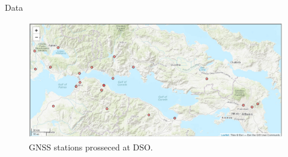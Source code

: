 \documentclass[final,a0,portrait]{beamer}
\newlength{\onecolwid}
\begin{document}
\begin{frame}[t]
\begin{columns}[t]
\begin{column}{\onecolwid}
\begin{block}{Data}
{%
}
\begin{figure}
  \centering
  \includegraphics[width=1\onecolwid]{gsg2022_sta.png}
  \caption{GNSS stations prosseced at DSO.}
  \label{fig:grnets}
\end{figure}
\end{block}



\end{column} %


\end{columns}
\end{frame}
\end{document}
